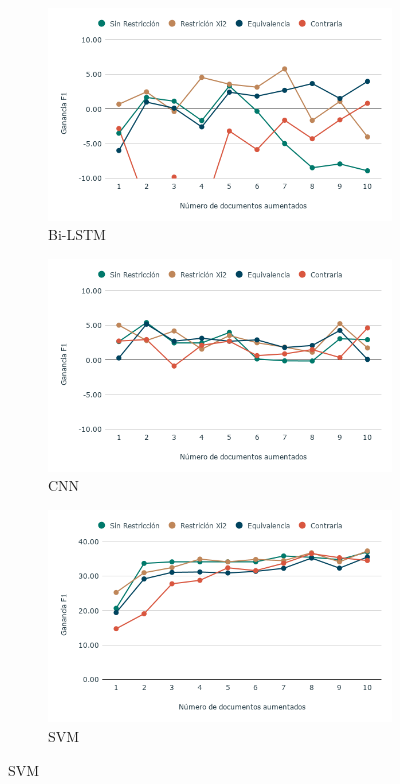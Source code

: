 \begin{figure}[hbt!]
    \begin{center}
    \begin{subfigure}[b]{0.6\textwidth}
        \includegraphics[width=\textwidth]{sections/figures/Bi-LSTM-dep.png}
        \caption{Bi-LSTM}
    \end{subfigure}
    \hfill
    
    \begin{subfigure}[!h]{0.6\textwidth}
        \includegraphics[width=\textwidth]{sections/figures/CNN_dep.png}
        \caption{CNN}
    \end{subfigure}
  
    \begin{subfigure}[b]{0.6\textwidth}
        \includegraphics[width=\textwidth]{sections/figures/SVM_dep.png}
        \caption{SVM}
    \end{subfigure}
    \end{center}
   

\end{figure}
